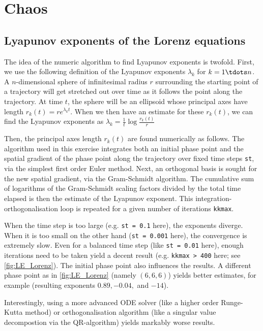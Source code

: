 \graphicspath{{../figures/5/}}


\chapter{Chaos}



\section{Lyapunov exponents of the Lorenz equations}
\label{sec:lorenz}

The idea of the numeric algorithm to find Lyapunov exponents is twofold. First, we use the following definition of the Lyapunov exponents $\lambda_k$ for $k = 1 \tdots n$. A $n$-dimensional sphere of infinitesimal radius $r$ surrounding the starting point of a trajectory will get stretched out over time as it follows the point along the trajectory. At time $t$, the sphere will be an ellipsoid whose principal axes have length $r_k(t) = r e^{\lambda_k t}$. When we then have an estimate for these $r_k(t)$, we can find the Lyapunov exponents as $\lambda_k = \frac{1}{t} \log{\frac{r_k(t)}{r}}$

Then, the principal axes length $r_k(t)$ are found numerically as follows. The algorithm used in this exercise integrates both an initial phase point and the spatial gradient of the phase point along the trajectory over fixed time steps \texttt{st}, via the simplest first order Euler method. Next, an orthogonal basis is sought for the new spatial gradient, via the Gram-Schmidt algorithm. The cumulative sum of logarithms of the Gram-Schmidt scaling factors divided by the total time elapsed is then the estimate of the Lyapunov exponent. This integration-orthogonalisation loop is repeated for a given number of iterations \texttt{kkmax}.

When the time step is too large (e.g. \texttt{st = 0.1} here), the exponents diverge. When it is too small on the other hand (\texttt{st = 0.001} here), the convergence is extremely slow. Even for a balanced time step (like \texttt{st = 0.01} here), enough iterations need to be taken yield a decent result (e.g. \texttt{kkmax > 400} here; see \cref{fig:LE_Lorenz}). The initial phase point also influences the results. A different phase point as in \cref{fig:LE_Lorenz} (namely $(6,6,6)$) yields better estimates, for example (resulting exponents $0.89, -0.04, $ and $-14$).

Interestingly, using a more advanced ODE solver (like a higher order Runge-Kutta method) or orthogonalisation algorithm (like a singular value decompostion via the QR-algorithm) yields markably worse results.


